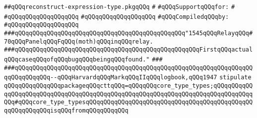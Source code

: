 \label{src/lib/compiler/debugging-and-profiling/types/reconstruct-expression-type.pkg}
\verb|##qQQqreconstruct-expression-type.pkgqQQq|\newline
\verb|#|\newline
\verb|#qQQqSupportqQQqfor:|\newline
\verb|#|\newline
\verb|#qQQqqQQqqQQqqQQqqQQq|\newline
\verb|#qQQqqQQqqQQqqQQqqQQq|\newline
\newline
\verb|#qQQqCompiledqQQqby:|\newline
\verb|#qQQqqQQqqQQqqQQqqQQq|\newline
\newline
\newline
\newline
\verb|###qQQqqQQqqQQqqQQqqQQqqQQqqQQqqQQqqQQqqQQqqQQqqQQq"1545qQQqRelayqQQq#70qQQqPanelqQQqFqQQq(moth)qQQqinqQQqrelay.|\newline
\verb|###qQQqqQQqqQQqqQQqqQQqqQQqqQQqqQQqqQQqqQQqqQQqqQQqqQQqFirstqQQqactualqQQqcaseqQQqofqQQqbugqQQqbeingqQQqfound."|\newline
\verb|###|\newline
\verb|###qQQqqQQqqQQqqQQqqQQqqQQqqQQqqQQqqQQqqQQqqQQqqQQqqQQqqQQqqQQqqQQqqQQqqQQqqQQqqQQq--qQQqHarvardqQQqMarkqQQqIIqQQqlogbook,qQQq1947|\newline
\newline
\newline
\newline
\verb|stipulate|\newline
\verb|qQQqqQQqqQQqqQQqpackageqQQqcttqQQq=qQQqqQQqcore_type_types;qQQqqQQqqQQqqQQqqQQqqQQqqQQqqQQqqQQqqQQqqQQqqQQqqQQqqQQqqQQqqQQqqQQqqQQqqQQqqQQqqQQq#qQQqcore_type_typesqQQqqQQqqQQqqQQqqQQqqQQqqQQqqQQqqQQqqQQqqQQqqQQqqQQqqQQqqQQqisqQQqfromqQQqqQQqqQQq|\newline

